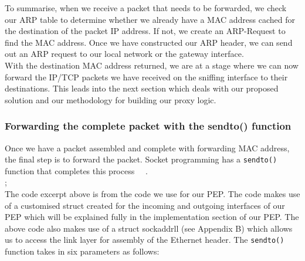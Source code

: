 To summarise, when we receive a packet that needs to be forwarded, we check our ARP table to determine whether we already have a MAC address cached for the destination of the packet IP address. If not, we create an ARP-Request to find the MAC address. Once we have constructed our ARP header, we can send out an ARP request to our local network or the gateway interface.\\

With the destination MAC address returned, we are at a stage where we can now forward the IP/TCP packets we have received on the sniffing interface to their destinations. This leads into the next section which deals with our proposed solution and our methodology for building our proxy logic. \\

\subsubsection{Forwarding the complete packet with the sendto() function}
Once we have a packet assembled and complete with forwarding MAC address, the final step is to forward the packet. Socket programming has a {\tt sendto()} function that completes this process ~\cite{35}~\cite{38}. \\

;\\

The code excerpt above is from the code we use for our PEP. The code makes use of a customised struct created for the incoming and outgoing interfaces of our PEP which will be explained fully in the implementation section of our PEP. The above code also makes use of a struct sockaddr\textunderscore ll (see Appendix B) which allows us to access the link layer for assembly of the Ethernet header. The {\tt sendto()} function takes in six parameters as follows:\\

